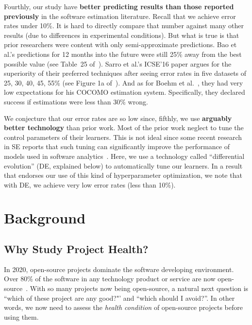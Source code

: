 \documentclass[sigconf,anonymous,review]{acmart}
\begin{document}
Fourthly, our study have {\bf better predicting results than those reported previously} in the software estimation literature. 
Recall that   we achieve error rates under 10\%.
It is hard to directly compare that number against many other results
(due to differences in experimental conditions). But what is true is  that prior researchers were  content with only
semi-approximate predictions.
Bao et al.'s predictions for 12  months into the future were still 25\% away from the best possible value (see Table~25 of~\cite{bao2019large}).
Sarro et al.'s ICSE'16  paper argues for the superiority of their preferred techniques after seeing error rates in five datasets
of 25, 30, 40, 45, 55\% (see Figure 1a of~\cite{sarro2016multi}).
And as for Boehm et al.~\cite{boehm2000cost}, they had very low expectations for his COCOMO estimation system.
Specifically, they declared success if estimations were less than 30\% wrong.
 
We conjecture that our error rates are so low since,
fifthly, we use {\bf arguably better technology} than prior work. 
Most of the prior work neglect to tune the control parameters of their learners.
This is not ideal since some recent research in SE reports that such tuning can significantly improve the performance of models used in software analytics~\cite{Tantithamthavorn16,fu2016differential,Fu2016TuningFS,agrawal2018betterdata,agrawal2019dodge,agrawal2018better}.
Here,  we use
a technology called ``differential evolution'' (DE, explained below) to automatically tune  our learners.
In a result that endorses our use of  this kind of hyperparameter optimization,
we note that with DE, we achieve very low error rates (less than 10\%).


 

\section{Background}
\label{sect:backg}
\subsection{Why Study Project Health?}
In 2020, open-source projects dominate the software developing environment\cite{Paasivaara18,santos2016investigating,Hohl18,Parnin17}.
Over 80\% of the software in any technology product or service are now open-source~\cite{zemlin2017}. 
With so many projects now being open-source, a natural next question is ``which of these project are any good?"' and ``which should I avoid?''.
 In other words, we now need to assess
 the   {\em health condition} of open-source projects before using them.
 
\end{document}

